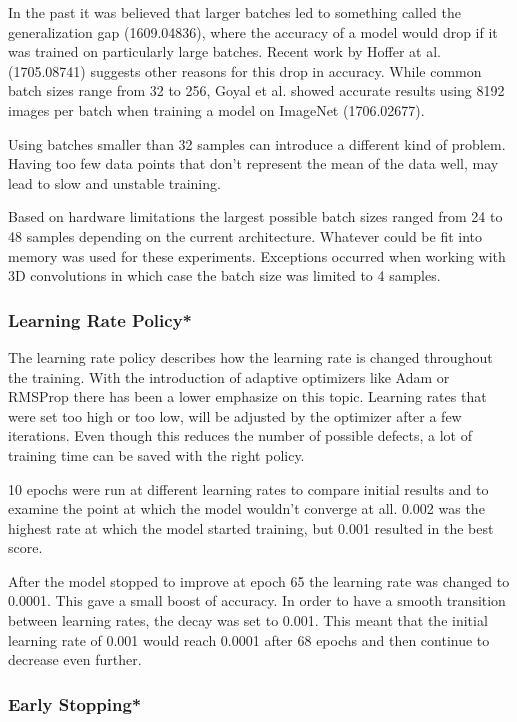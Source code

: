 In the past it was believed that larger batches led to something called the generalization gap (1609.04836), where the accuracy of a model would drop if it was trained on particularly large batches. Recent work by Hoffer at al. (1705.08741) suggests other reasons for this drop in accuracy. While common batch sizes range from 32 to 256, Goyal et al. showed accurate results using 8192 images per batch when training a model on ImageNet (1706.02677).

Using batches smaller than 32 samples can introduce a different kind of problem. Having too few data points that don't represent the mean of the data well, may lead to slow and unstable training.

Based on hardware limitations the largest possible batch sizes ranged from 24 to 48 samples depending on the current architecture. Whatever could be fit into memory was used for these experiments. Exceptions occurred when working with 3D convolutions in which case the batch size was limited to 4 samples.

\subsubsection{Learning Rate Policy*}

The learning rate policy describes how the learning rate is changed throughout the training. With the introduction of adaptive optimizers like Adam or RMSProp there has been a lower emphasize on this topic. Learning rates that were set too high or too low, will be adjusted by the optimizer after a few iterations. Even though this reduces the number of possible defects, a lot of training time can be saved with the right policy.

10 epochs were run at different learning rates to compare initial results and to examine the point at which the model wouldn't converge at all. 0.002 was the highest rate at which the model started training, but 0.001 resulted in the best score.

After the model stopped to improve at epoch 65 the learning rate was changed to 0.0001. This gave a small boost of accuracy. In order to have a smooth transition between learning rates, the decay was set to 0.001. This meant that the initial learning rate of 0.001 would reach 0.0001 after 68 epochs and then continue to decrease even further.

\subsubsection{Early Stopping*}


